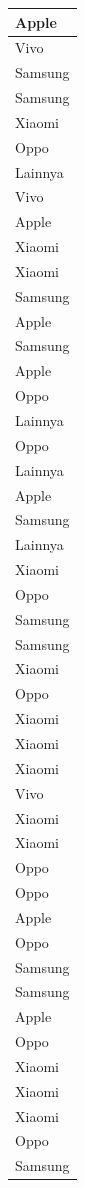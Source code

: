 \documentclass[
  letterpaper,
  DIV=11,
  numbers=noendperiod]{scrartcl}
\begin{document}
\begin{table}
\begin{tabular}[t]{l}
\hline
Apple\\
\hline
Vivo\\
\hline
Samsung\\
\hline
Samsung\\
\hline
Xiaomi\\
\hline
Oppo\\
\hline
Lainnya\\
\hline
Vivo\\
\hline
Apple\\
\hline
Xiaomi\\
\hline
Xiaomi\\
\hline
Samsung\\
\hline
Apple\\
\hline
Samsung\\
\hline
Apple\\
\hline
Oppo\\
\hline
Lainnya\\
\hline
Oppo\\
\hline
Lainnya\\
\hline
Apple\\
\hline
Samsung\\
\hline
Lainnya\\
\hline
Xiaomi\\
\hline
Oppo\\
\hline
Samsung\\
\hline
Samsung\\
\hline
Xiaomi\\
\hline
Oppo\\
\hline
Xiaomi\\
\hline
Xiaomi\\
\hline
Xiaomi\\
\hline
Vivo\\
\hline
Xiaomi\\
\hline
Xiaomi\\
\hline
Oppo\\
\hline
Oppo\\
\hline
Apple\\
\hline
Oppo\\
\hline
Samsung\\
\hline
Samsung\\
\hline
Apple\\
\hline
Oppo\\
\hline
Xiaomi\\
\hline
Xiaomi\\
\hline
Xiaomi\\
\hline
Oppo\\
\hline
Samsung\\

\end{tabular}
\end{table}
\end{document}
